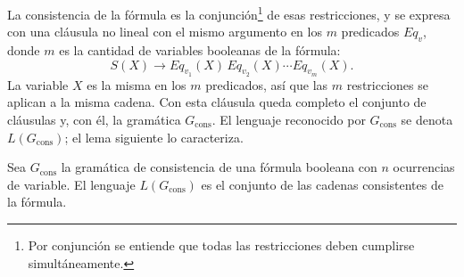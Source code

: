 La consistencia
de la fórmula es la conjunción\footnote{Por conjunción se entiende que
todas las restricciones deben cumplirse simultáneamente.} de esas
restricciones, y se expresa con
una cláusula no lineal con el mismo argumento en los $m$ predicados
$Eq_v$, donde $m$ es la cantidad de variables booleanas de la fórmula:
\[
  S(X) \to Eq_{v_1}(X)\, Eq_{v_2}(X) \cdots Eq_{v_m}(X).
\]
La variable $X$ es la misma en los $m$ predicados, así que las $m$
restricciones se aplican a la misma cadena. Con esta cláusula queda
completo el conjunto de cláusulas y, con él, la gramática
$G_{\mathrm{cons}}$. El lenguaje reconocido por $G_{\mathrm{cons}}$ se
denota $L(G_{\mathrm{cons}})$; el lema siguiente lo caracteriza.

\begin{lema}
\label{lema:lenguaje-gcons}
Sea $G_{\mathrm{cons}}$ la gramática de consistencia de una fórmula
booleana con $n$ ocurrencias de variable. El lenguaje
$L(G_{\mathrm{cons}})$ es el conjunto de las cadenas consistentes de
la fórmula.
\end{lema}

